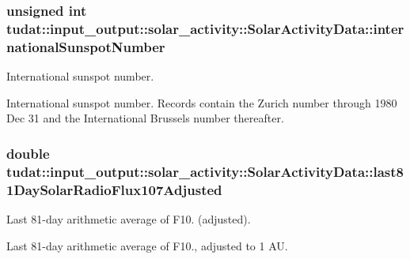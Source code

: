 \subsubsection[{\texorpdfstring{international\+Sunspot\+Number}{internationalSunspotNumber}}]{\setlength{\rightskip}{0pt plus 5cm}unsigned int tudat\+::input\+\_\+output\+::solar\+\_\+activity\+::\+Solar\+Activity\+Data\+::international\+Sunspot\+Number}\hypertarget{structtudat_1_1input__output_1_1solar__activity_1_1SolarActivityData_a59da73b162a15946211ee5a8f21f9551}{}\label{structtudat_1_1input__output_1_1solar__activity_1_1SolarActivityData_a59da73b162a15946211ee5a8f21f9551}


International sunspot number. 

International sunspot number. Records contain the Zurich number through 1980 Dec 31 and the International Brussels number thereafter. 
\subsubsection[{\texorpdfstring{last81\+Day\+Solar\+Radio\+Flux107\+Adjusted}{last81DaySolarRadioFlux107Adjusted}}]{\setlength{\rightskip}{0pt plus 5cm}double tudat\+::input\+\_\+output\+::solar\+\_\+activity\+::\+Solar\+Activity\+Data\+::last81\+Day\+Solar\+Radio\+Flux107\+Adjusted}\hypertarget{structtudat_1_1input__output_1_1solar__activity_1_1SolarActivityData_a8dc1de421cb8cb106e7d6f1af9382dec}{}\label{structtudat_1_1input__output_1_1solar__activity_1_1SolarActivityData_a8dc1de421cb8cb106e7d6f1af9382dec}


Last 81-\/day arithmetic average of F10. (adjusted). 

Last 81-\/day arithmetic average of F10., adjusted to 1 AU. 
